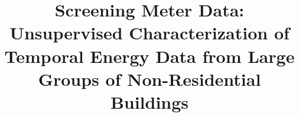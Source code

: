 
\title{Screening Meter Data: Unsupervised Characterization of Temporal Energy Data from Large Groups of Non-Residential Buildings}
